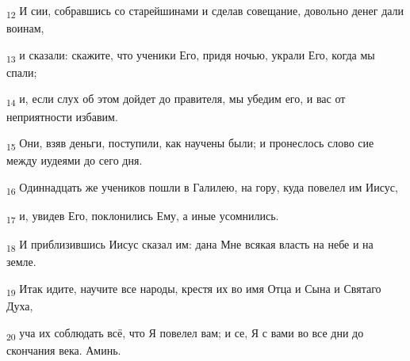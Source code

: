 \begin{tcolorbox}
\textsubscript{12} И сии, собравшись со старейшинами и сделав совещание, довольно денег дали воинам,
\end{tcolorbox}
\begin{tcolorbox}
\textsubscript{13} и сказали: скажите, что ученики Его, придя ночью, украли Его, когда мы спали;
\end{tcolorbox}
\begin{tcolorbox}
\textsubscript{14} и, если слух об этом дойдет до правителя, мы убедим его, и вас от неприятности избавим.
\end{tcolorbox}
\begin{tcolorbox}
\textsubscript{15} Они, взяв деньги, поступили, как научены были; и пронеслось слово сие между иудеями до сего дня.
\end{tcolorbox}
\begin{tcolorbox}
\textsubscript{16} Одиннадцать же учеников пошли в Галилею, на гору, куда повелел им Иисус,
\end{tcolorbox}
\begin{tcolorbox}
\textsubscript{17} и, увидев Его, поклонились Ему, а иные усомнились.
\end{tcolorbox}
\begin{tcolorbox}
\textsubscript{18} И приблизившись Иисус сказал им: дана Мне всякая власть на небе и на земле.
\end{tcolorbox}
\begin{tcolorbox}
\textsubscript{19} Итак идите, научите все народы, крестя их во имя Отца и Сына и Святаго Духа,
\end{tcolorbox}
\begin{tcolorbox}
\textsubscript{20} уча их соблюдать всё, что Я повелел вам; и се, Я с вами во все дни до скончания века. Аминь.
\end{tcolorbox}

